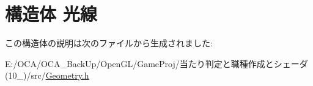 \hypertarget{struct_xE5_x85_x89_xE7_xB7_x9A}{\section{構造体 光線}
\label{struct_xE5_x85_x89_xE7_xB7_x9A}
}


この構造体の説明は次のファイルから生成されました\-:\begin{DoxyCompactItemize}
\item 
E\-:/\-O\-C\-A/\-O\-C\-A\-\_\-\-Back\-Up/\-Open\-G\-L/\-Game\-Proj/当たり判定と職種作成とシェーダ(10\-\_)/src/\hyperlink{_geometry_8h}{Geometry.\-h}\end{DoxyCompactItemize}
